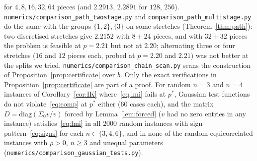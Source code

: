 \documentclass[11pt]{amsart}
\theoremstyle{definition}
\begin{document}
for $4,8,16,32,64$ pieces (and $2.2913$, $2.2891$ for $128$, $256$).
\texttt{numerics/comparison\_path\_twostage.py} and \texttt{comparison\_path\_multistage.py} do the same with the
groups $\{1,2\},\{3\}$ on some stretches (Theorem~\ref{thm:path}): two discretised stretches give $2.2152$ with $8+24$
pieces, and with $32+32$ pieces the problem is feasible at $p=2.21$ but not at $2.20$; alternating three or four
stretches ($16$ and $12$ pieces each, probed at $p=2.20$ and $2.21$) was not better at the splits we tried. \texttt{numerics/comparison\_chain\_scan.py} scans the construction
of Proposition~\ref{prop:certificate} over $b$. Only the exact verifications
in Proposition~\ref{prop:certificate} are part of a proof. For random $n=3$ and $n=4$ instances of Corollary~\ref{cor:IK}
where~\eqref{eq:lmi} fails at $p^*$, Gaussian test functions do not violate~\eqref{eq:comp} at $p^*$ either ($60$ cases
each), and the matrix $D=\mathrm{diag}(\Sigma_0v/v)$ forced by Lemma~\ref{lem:forced} ($v$ had no zero entries in any
instance) satisfies~\eqref{eq:lmi} in all $2000$ random instances with sign pattern~\eqref{eq:signs} for each
$n\in\{3,4,6\}$, and in none of the random equicorrelated instances with $\rho>0$, $n\ge3$ and unequal parameters
(\texttt{numerics/comparison\_gaussian\_tests.py}).
\end{document}
